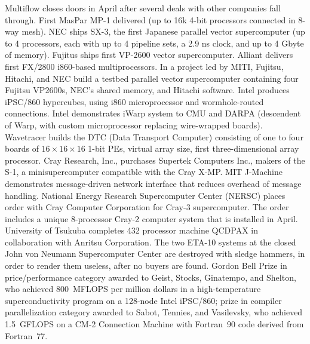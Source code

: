 	{Multiflow closes doors in April after several deals
	with other companies fall through.}
	{First MasPar MP-1 delivered
	(up to 16k 4-bit processors connected in 8-way mesh).}
	{NEC ships SX-3,
	the first Japanese parallel vector supercomputer
	(up to 4 processors, each with up to 4 pipeline sets,
	a 2.9 ns clock,
	and up to 4 Gbyte of memory).}
	{Fujitus ships first VP-2600 vector supercomputer.}
	{Alliant delivers first FX/2800 i860-based multiprocessors.}
	{In a project led by MITI,
	Fujitsu, Hitachi, and NEC build
	a testbed parallel vector supercomputer containing
	four Fujitsu VP2600s,
	NEC's shared memory,
	and Hitachi software.}
	{Intel produces iPSC/860 hypercubes,
	using i860 microprocessor and wormhole-routed connections.}
	{Intel demonstrates iWarp system to CMU and DARPA
	(descendent of Warp,
	with custom microprocessor replacing wire-wrapped boards).}
        {Wavetracer builds the DTC (Data Transport Computer) 
        consisting of one to four boards of $16{\times}16{\times}16$ 1-bit 
        PEs, virtual array size, first three-dimensional array processor.}
	{Cray Research, Inc., purchases Supertek Computers Inc.,
	makers of the S-1, a minisupercomputer compatible
	with the Cray X-MP.}
	{MIT J-Machine demonstrates message-driven network
	interface that reduces overhead of message handling.}
	{National Energy Research Supercomputer Center (NERSC)
	places order with Cray Computer Corporation
	for Cray-3 supercomputer.
	The order includes a unique 8-processor
	Cray-2 computer system that is installed in April.}
	{University of Tsukuba completes 432 processor machine QCDPAX 
	in collaboration with Anritsu Corporation.}
	{The two ETA-10 systems at the closed John von Neumann
	Supercomputer Center are destroyed with sledge hammers,
	in order to render them useless, after no buyers are found.}
	{Gordon Bell Prize in price/performance category
	awarded to Geist, Stocks, Ginatempo, and Shelton,
	who achieved 800~MFLOPS per million dollars
	in a high-temperature superconductivity program
	on a 128-node Intel iPSC/860;
	prize in compiler parallelization category awarded to
	Sabot, Tennies, and Vasilevsky,
	who achieved 1.5~GFLOPS on a CM-2 Connection Machine
	with Fortran~90 code derived from Fortran~77.}
